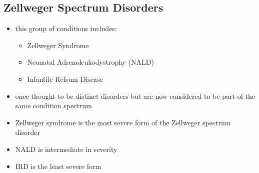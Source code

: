\documentclass{scrartcl}
\begin{document}
\subsection{Zellweger Spectrum Disorders}
\label{sec:org1ea4c09}
\begin{itemize}
\item this group of conditions includes:
\begin{itemize}
\item Zellweger Syndrome
\item Neonatal Adrenoleukodystrophy (NALD)
\item Infantile Refsum Disease
\end{itemize}
\item once thought to be distinct disorders but are now considered to be
part of the same condition spectrum
\item Zellweger syndrome is the most severe form of the Zellweger spectrum disorder
\item NALD is intermediate in severity
\item IRD is the least severe form
\end{itemize}
\end{document}
